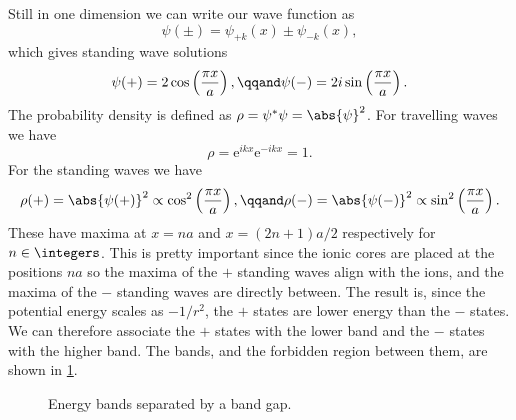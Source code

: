 \documentclass[fleqn]{NotesClass}
\newcommand*{\e}{\mathrm{e}}
\begin{document}
    Still in one dimension we can write our wave function as
    \begin{equation}
        \psi(\pm) = \psi_{+k}(x) \pm \psi_{-k}(x),
    \end{equation}
    which gives standing wave solutions
    \begin{equation}
        \psi(+) = 2\cos\left( \frac{\pi x}{a} \right), \qqand \psi(-) = 2i\sin\left( \frac{\pi x}{a} \right).
    \end{equation}
    The probability density is defined as \(\rho = \psi^*\psi = \abs{\psi}^2\).
    For travelling waves we have
    \begin{equation}
        \rho = \e^{ikx}\e^{-ikx} = 1.
    \end{equation}
    For the standing waves we have
    \begin{equation}
        \rho(+) = \abs{\psi(+)}^2 \propto \cos^2\left( \frac{\pi x}{a} \right), \qqand \rho(-) = \abs{\psi(-)}^2 \propto \sin^2\left( \frac{\pi x}{a} \right).
    \end{equation}
    These have maxima at \(x = na\) and \(x = (2n + 1)a/2\) respectively for \(n \in \integers\).
    This is pretty important since the ionic cores are placed at the positions \(na\) so the maxima of the \(+\) standing waves align with the ions, and the maxima of the \(-\) standing waves are directly between.
    The result is, since the potential energy scales as \(-1/r^2\), the \(+\) states are lower energy than the \(-\) states.
    We can therefore associate the \(+\) states with the lower band and the \(-\) states with the higher band.
    The bands, and the forbidden region between them, are shown in \cref{fig:energy bands one dimension}.
    
    \begin{figure}
        \caption{Energy bands separated by a band gap.}
        \label{fig:energy bands one dimension}
    \end{figure}
    
\end{document}
